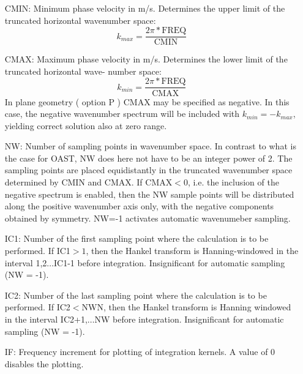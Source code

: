 \begin{itemize}
		\item[CMIN:]   Minimum phase velocity in m/s. Determines the
		upper limit of the truncated horizontal wavenumber space:
			\begin{displaymath}
			k_{max} = \frac{2\pi \ast \mbox{FREQ}}{\mbox{CMIN}}
			\end{displaymath}
		\item[CMAX:]	Maximum phase velocity in m/s. Determines the
		lower limit of the truncated horizontal wave-
		number space:
			\begin{displaymath}
			k_{min} = \frac{2\pi \ast \mbox{FREQ}}{\mbox{CMAX}}
			\end{displaymath}
		In plane geometry ( option P ) CMAX may be specified as 
		negative. In this case, the negative wavenumber spectrum
		will be included with $k_{min}=-k_{max}$, yielding correct 
		solution also at zero range.
		\item[NW:]	Number of sampling points in wavenumber space.
		In contrast to what is the case for OAST, 
		NW does here not have to be an integer  power of 2.				The sampling points are placed equidistantly
		in the truncated wavenumber space determined
		by CMIN and CMAX. If CMAX$<0$, i.e. the inclusion of
		the negative spectrum is enabled, then the NW sample
		points will be distributed along the positive
		wavenumber axis only, with the negative
		components obtained by symmetry. NW=-1 activates
		automatic wavenumeber sampling.

		\item[IC1:]  Number of the first sampling point where the
		calculation is to be performed. If IC1$>1$, 
		then the Hankel transform is Hanning-windowed in the
		interval 1,2$\ldots$IC1-1 before
		integration.  Insignificant for automatic sampling (NW
		= -1).

		\item[IC2:]	Number of the last sampling point where the 
		calculation is to be performed. If IC2$<$NWN,
		then the Hankel transform is Hanning windowed in the
		interval IC2+1,$\ldots$NW before integration. Insignificant for automatic sampling (NW
		= -1).

		\item[IF:] Frequency increment for plotting of
integration  kernels. A value of 0 disables the plotting.
		\end{itemize}
 



